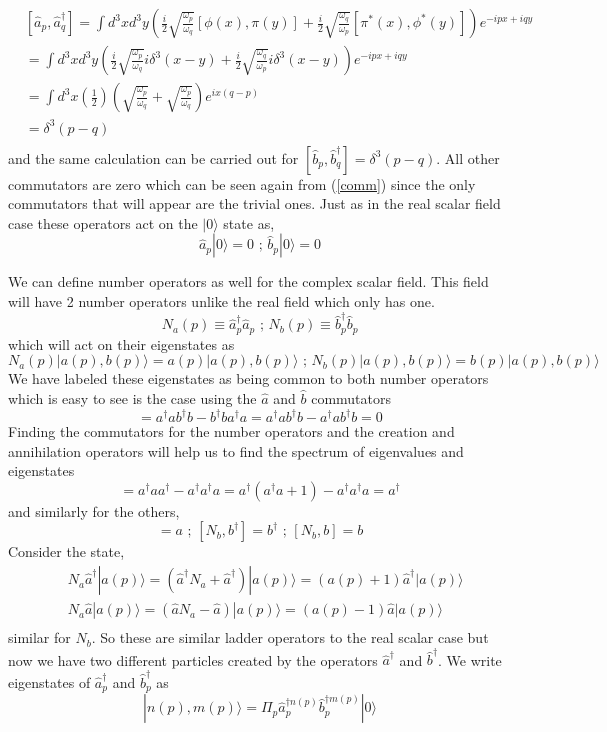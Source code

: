 \documentclass{article}
\numberwithin{equation}{section}
\newcommand{\beq}{\begin{equation}}
\newcommand{\eeq}{\end{equation}}
\begin{document}
\beq \begin{split}
    &[\hat{a}_p,\hat{a}^\dagger_q] = \int d^3x d^3y \left(\frac{i}{2}\sqrt{\frac{\omega_p}{\omega_q}}[\phi(x),\pi(y)] + \frac{i}{2}\sqrt{\frac{\omega_q}{\omega_p}}[\pi^*(x),\phi^*(y)] \right)e^{-ipx+iqy} \\
    & = \int d^3x d^3y \left(\frac{i}{2}\sqrt{\frac{\omega_p}{\omega_q}}i\delta^3(x-y) + \frac{i}{2}\sqrt{\frac{\omega_q}{\omega_p}}i\delta^3(x-y) \right)e^{-ipx+iqy} \\
    &= \int d^3x \left(\frac{1}{2}\right)\left(\sqrt{\frac{\omega_p}{\omega_q}} +\sqrt{\frac{\omega_p}{\omega_q}} \right)e^{ix(q-p)} \\
    & = \delta^3(p-q) \\
\end{split}\eeq 
and the same calculation can be carried out for $[\hat{b}_p,\hat{b}^\dagger_q]=\delta^3(p-q)$. All other commutators are zero which can be seen again from (\ref{comm}) since the 
only commutators that will appear are the trivial ones. Just as in the real scalar field case these operators act on the $|0\rangle$ state as,
\beq
    \hat{a}_p|0\rangle = 0 \text{ ;         } \hat{b}_p|0\rangle = 0
\eeq    

We can define number operators as well for the complex scalar field. This field will have 2 number operators unlike the real field which only has one.
\beq
    N_a(p) \equiv \hat{a}^\dagger_p \hat{a}_p \text{      ;      }  
    N_b(p) \equiv \hat{b}^\dagger_p \hat{b}_p
\eeq
which will act on their eigenstates as
\beq
    N_a(p)|a(p),b(p)\rangle = a(p)|a(p),b(p)\rangle \text{ ; } N_b(p)|a(p),b(p)\rangle = b(p)|a(p),b(p)\rangle
\eeq
We have labeled these eigenstates as being common to both number operators which is easy to see is the case using the $\hat{a}$ and $\hat{b}$ commutators
\beq
    [N_a,N_b] = a^\dagger a b^\dagger b - b^\dagger b a^\dagger a = a^\dagger a b^\dagger b - a^\dagger a b^\dagger b = 0
\eeq
Finding the commutators for the number operators and the creation and annihilation operators will help us to find the spectrum of eigenvalues and eigenstates
\beq
    [N_a, a^\dagger] = a^\dagger a a^\dagger - a^\dagger a^\dagger a = a^\dagger(a^\dagger a + 1) - a^\dagger a^\dagger a = a^\dagger
\eeq
and similarly for the others,
\beq
    [N_a, a] = a \text{ ; } [N_b, b^\dagger] = b^\dagger \text{ ; } [N_b, b] = b
\eeq
Consider the state,
\beq \begin{split}
    &N_a \hat{a}^\dagger|a(p)\rangle = (\hat{a}^\dagger N_a + \hat{a}^\dagger)|a(p)\rangle = (a(p)+1)\hat{a}^\dagger|a(p)\rangle \\
    &N_a \hat{a}|a(p)\rangle = (\hat{a} N_a - \hat{a})|a(p)\rangle = (a(p)-1)\hat{a}|a(p)\rangle \\
\end{split} \eeq
similar for $N_b$. So these are similar ladder operators to the real scalar case but now we have two different particles created by the operators $\hat{a}^\dagger$
and $\hat{b}^\dagger$.
We write eigenstates of $\hat{a}^\dagger_p$ and $\hat{b}^\dagger_p$ as
\beq
    |n(p),m(p)\rangle = \Pi_p \hat{a}^{\dagger n(p)}_p \hat{b}^{\dagger m(p)}_p|0\rangle
\eeq
\end{document}
